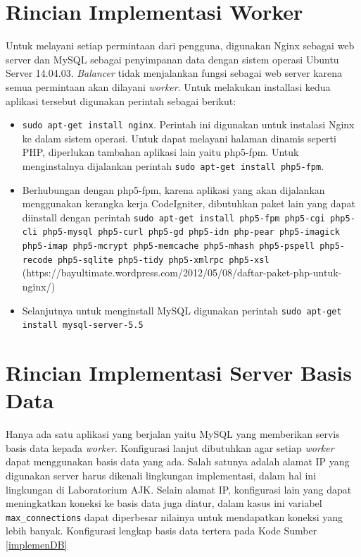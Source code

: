 \documentclass{ta-its}
\begin{document}
		\section{Rincian Implementasi Worker}
			Untuk melayani setiap permintaan dari pengguna, digunakan Nginx sebagai web server dan MySQL sebagai penyimpanan data dengan sistem operasi Ubuntu Server 14.04.03. \textit{Balancer} tidak menjalankan fungsi sebagai web server karena semua permintaan akan dilayani \textit{worker}. Untuk melakukan installasi kedua aplikasi tersebut digunakan perintah sebagai berikut:
			
			\begin{itemize}
				\item \texttt{sudo apt-get install nginx}. Perintah ini digunakan untuk instalasi Nginx ke dalam sistem operasi. Untuk dapat melayani halaman dinamis seperti PHP, diperlukan tambahan aplikasi lain yaitu php5-fpm. Untuk menginstalnya dijalankan perintah \texttt{sudo apt-get install php5-fpm}. 
				\item Berhubungan dengan php5-fpm, karena aplikasi yang akan dijalankan menggunakan kerangka kerja CodeIgniter, dibutuhkan paket lain yang dapat diinstall dengan perintah \texttt{sudo apt-get install php5-fpm php5-cgi php5-cli php5-mysql php5-curl php5-gd php5-idn php-pear php5-imagick php5-imap php5-mcrypt php5-memcache php5-mhash php5-pspell php5-recode php5-sqlite php5-tidy php5-xmlrpc php5-xsl} (https://bayultimate.wordpress.com/2012/05/08/daftar-paket-php-untuk-nginx/)
				\item Selanjutnya untuk menginstall MySQL digunakan perintah \texttt{sudo apt-get install mysql-server-5.5}
			\end{itemize}
			
			
		
		\section{Rincian Implementasi Server Basis Data}
			Hanya ada satu aplikasi yang berjalan yaitu MySQL yang memberikan servis basis data kepada \textit{worker}. Konfigurasi lanjut dibutuhkan agar setiap \textit{worker} dapat menggunakan basis data yang ada. Salah satunya adalah alamat IP yang digunakan server harus dikenali lingkungan implementasi, dalam hal ini lingkungan di Laboratorium AJK. Selain alamat IP, konfigurasi lain yang dapat meningkatkan koneksi ke basis data juga diatur, dalam kasus ini variabel \texttt{max\_connections} dapat diperbesar nilainya untuk mendapatkan koneksi yang lebih banyak. Konfigurasi lengkap basis data tertera pada Kode Sumber \ref{implemenDB}
		    
\end{document}
